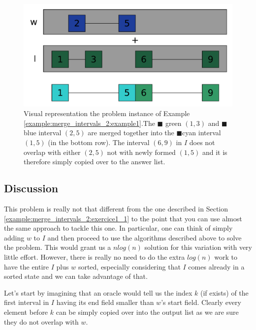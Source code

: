 \begin{figure}
	\centering
	\includegraphics[width=\textwidth]{sources/merge_intervals_2/images/example1}
	\caption[Implicit graph for the Example \ref{example:merge_intervals_2:example1}.]
	{Visual representation the problem instance of Example
	\ref{example:merge_intervals_2:example1}.The \textcolor[HTML]{339966}{$\blacksquare$} green $(1,3)$ and \textcolor[HTML]{3366ff}{$\blacksquare$} blue interval $(2,5)$  are merged together into the \textcolor[HTML]{33cccc}{$\blacksquare$}cyan interval $(1,5)$ (in the bottom row). The interval $(6,9)$ in $I$ does not overlap with either $(2,5)$ not with newly formed $(1,5)$ and it is therefore simply copied over to the answer list.}
	\label{fig:merge_intervals_2:example1}
\end{figure}


\FloatBarrier

\subsection{Discussion}
\label{merge_intervals_2:sec:discussion_1}
This problem is really not that different from the one described in Section \ref{example:merge_intervals_2:exercice1_1} to the point that you can use almost the same approach to tackle this one. In particular, one can think of simply adding $w$ to $I$ and then proceed to use the algorithms described above to solve the problem. This would grant us a $nlog(n)$ solution for this variation with very little effort. 
However, there is really no need to do the extra $log(n)$ work to have the entire $I$ plus $w$ sorted, especially considering that $I$ comes already in a sorted state and we can take advantage of that. 

Let's start by imagining that an oracle would tell us the index $k$ (if exists) of the first interval in $I$ having its end field smaller than $w$'s start field.
Clearly every element before $k$ can be simply copied over into the output list as we are sure they do not overlap with $w$.


